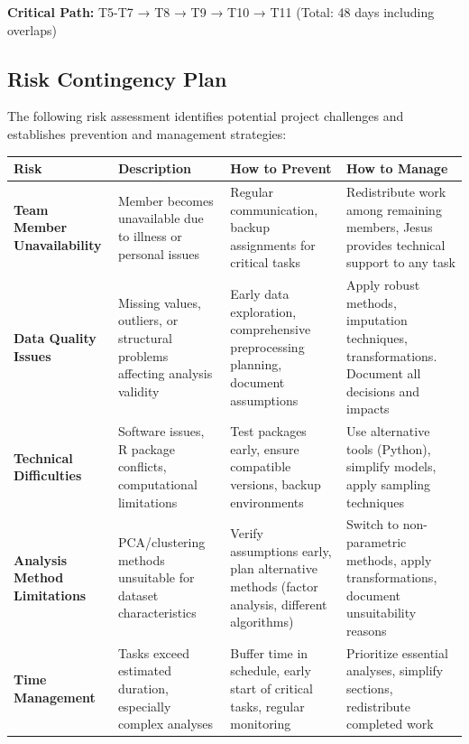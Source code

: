 \documentclass[12pt,a4paper]{article}
\begin{document}
\textbf{\textcolor{secondaryblue}{Critical Path:}} T5-T7 → T8 → T9 → T10 → T11 (Total: 48 days including overlaps)

\newpage
\subsection{Risk Contingency Plan}

The following risk assessment identifies potential project challenges and establishes prevention and management strategies:

\begin{table}[H]
\centering
\tiny
\renewcommand{\arraystretch}{1.3}
\begin{tabular}{|p{2.8cm}|p{3.2cm}|p{3.8cm}|p{3.8cm}|}
\hline
\rowcolor{primaryblue!10}
\textbf{\textcolor{primaryblue}{Risk}} & \textbf{\textcolor{primaryblue}{Description}} & \textbf{\textcolor{primaryblue}{How to Prevent}} & \textbf{\textcolor{primaryblue}{How to Manage}} \\
\hline
\textbf{Team Member Unavailability} & Member becomes unavailable due to illness or personal issues & Regular communication, backup assignments for critical tasks & Redistribute work among remaining members, Jesus provides technical support to any task \\
\hline
\textbf{Data Quality Issues} & Missing values, outliers, or structural problems affecting analysis validity & Early data exploration, comprehensive preprocessing planning, document assumptions & Apply robust methods, imputation techniques, transformations. Document all decisions and impacts \\
\hline
\textbf{Technical Difficulties} & Software issues, R package conflicts, computational limitations & Test packages early, ensure compatible versions, backup environments & Use alternative tools (Python), simplify models, apply sampling techniques \\
\hline
\textbf{Analysis Method Limitations} & PCA/clustering methods unsuitable for dataset characteristics & Verify assumptions early, plan alternative methods (factor analysis, different algorithms) & Switch to non-parametric methods, apply transformations, document unsuitability reasons \\
\hline
\textbf{Time Management} & Tasks exceed estimated duration, especially complex analyses & Buffer time in schedule, early start of critical tasks, regular monitoring & Prioritize essential analyses, simplify sections, redistribute completed work \\

\end{tabular}
\end{table}
\end{document}
